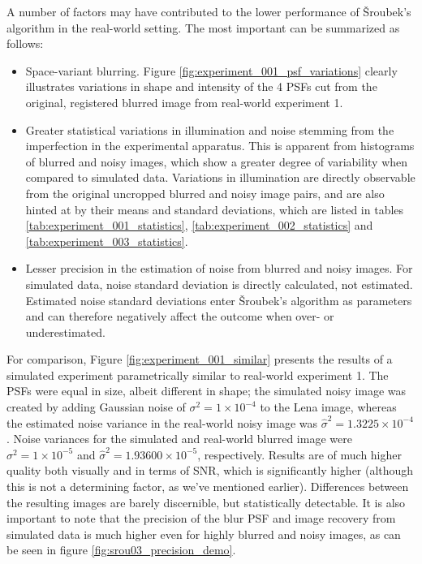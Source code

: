 \documentclass[12pt,notitlepage]{report}
\begin{document}
A number of factors may have contributed to the lower performance of Šroubek's algorithm in the real-world setting. The most important can be summarized as follows:
\begin{itemize}
	\item Space-variant blurring. Figure \ref{fig:experiment_001_psf_variations} clearly illustrates variations in shape and intensity of the 4 PSFs cut from the original, registered blurred image from real-world experiment 1. 
	\item Greater statistical variations in illumination and noise stemming from the imperfection in the experimental apparatus. This is apparent from histograms of blurred and noisy images, which show a greater degree of variability when compared to simulated data. Variations in illumination are directly observable from the original uncropped blurred and noisy image pairs, and are also hinted at by their means and standard deviations, which are listed in tables \ref{tab:experiment_001_statistics}, \ref{tab:experiment_002_statistics} and \ref{tab:experiment_003_statistics}. 
	\item Lesser precision in the estimation of noise from blurred and noisy images. For simulated data, noise standard deviation is directly calculated, not estimated. Estimated noise standard deviations enter Šroubek's algorithm as parameters and can therefore negatively affect the outcome when over- or underestimated.
\end{itemize}

For comparison, Figure \ref{fig:experiment_001_similar} presents the results of a simulated experiment parametrically similar to real-world experiment 1. The PSFs were equal in size, albeit different in shape; the simulated noisy image was created by adding Gaussian noise of $\sigma^2 = 1 \times 10^{-4}$ to the Lena image, whereas the estimated noise variance in the real-world noisy image was $\hat{\sigma}^2 = 1.3225 \times 10^{-4}$. Noise variances for the simulated and real-world blurred image were $\sigma^2 = 1 \times 10^{-5}$ and $\hat{\sigma}^2 = 1.93600 \times 10^{-5}$, respectively. Results are of much higher quality both visually and in terms of SNR, which is significantly higher (although this is not a determining factor, as we've mentioned earlier). Differences between the resulting images are barely discernible, but statistically detectable. It is also important to note that the precision of the blur PSF and image recovery from simulated data is much higher even for highly blurred and noisy images, as can be seen in figure \ref{fig:srou03_precision_demo}.
\end{document}
